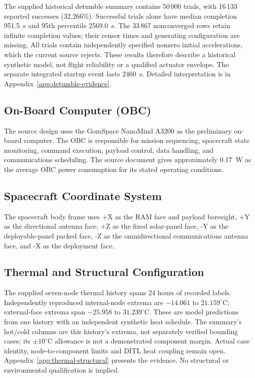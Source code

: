 The supplied historical detumble summary contains 50\,000 trials, with 16\,133 reported successes (32.266\%). Successful trials alone have median completion 951.5~s and 95th percentile 2569.0~s. The 33\,867 nonconverged rows retain infinite completion values; their censor times and generating configuration are missing. All trials contain independently specified nonzero initial accelerations, which the current source rejects. These results therefore describe a historical synthetic model, not flight reliability or a qualified actuator envelope. The separate integrated startup event lasts 2460~s. Detailed interpretation is in Appendix~\ref{app:detumble-evidence}.



\subsection{On-Board Computer (OBC)}\label{on-board-computer-obc}
The source design uses the GomSpace NanoMind A3200 as the preliminary on-board computer. The OBC is responsible for mission sequencing, spacecraft state monitoring, command execution, payload control, data handling, and communications scheduling. The source document gives approximately 0.17~W as the average OBC power consumption for its stated operating conditions.



\subsection{Spacecraft Coordinate System}\label{spacecraft-coordinate-system}
The spacecraft body frame uses +X as the RAM face and payload boresight, +Y as the directional antenna face, +Z as the fixed solar-panel face, -Y as the deployable-panel packed face, -Z as the omnidirectional communications antenna face, and -X as the deployment face.



\subsection{Thermal and Structural Configuration}\label{sec:thermal-architecture}
The supplied seven-node thermal history spans 24 hours of recorded labels. Independently reproduced internal-node extrema are $-14.061$ to $21.159^\circ$C; external-face extrema span $-25.958$ to $31.239^\circ$C. These are model predictions from one history with an independent synthetic heat schedule. The summary's hot/cold columns are this history's extrema, not separately verified bounding cases; its $\pm10^\circ$C allowance is not a demonstrated component margin. Actual case identity, node-to-component limits and DITL heat coupling remain open. Appendix~\ref{app:thermal-structural} presents the evidence. No structural or environmental qualification is implied.

